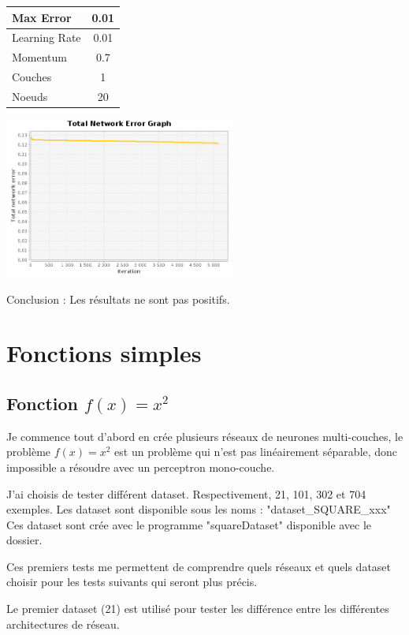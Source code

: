 \documentclass[10pt]{report}
\begin{document}
\begin{tabular}{|l|c|}
	\hline
	Max Error & 0.01 \\
	\hline
	Learning Rate & 0.01 \\
	\hline
	Momentum & 0.7 \\
	\hline
	Couches & 1 \\
	\hline
	Noeuds & 20 \\
	\hline
\end{tabular}

\begin{center}
\includegraphics[height=200px]{img/EQ_EG_12.png}\\
\end{center}

Conclusion : Les résultats ne sont pas positifs.

\section{Fonctions simples}
\subsection{Fonction $f(x)=x^2$}

Je commence tout d'abord en crée plusieurs réseaux de neurones multi-couches, le problème $f(x)=x^2$ est un problème qui n'est pas linéairement séparable, donc impossible a résoudre avec un perceptron mono-couche.

J'ai choisis de tester différent dataset. Respectivement, 21, 101, 302 et 704 exemples. Les dataset sont disponible sous les noms : "dataset\_SQUARE\_xxx"
Ces dataset sont crée avec le programme "squareDataset" disponible avec le dossier.

Ces premiers tests me permettent de comprendre quels réseaux et quels dataset choisir pour les tests suivants qui seront plus précis.

Le premier dataset (21) est utilisé pour tester les différence entre les différentes architectures de réseau.
\end{document}
